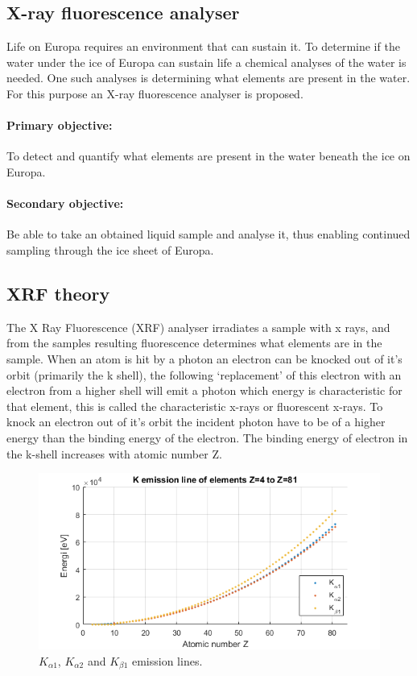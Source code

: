 \subsection{X-ray fluorescence analyser}
Life on Europa requires an environment that can sustain it. To determine if the water under the ice of Europa can sustain life a chemical analyses of the water is needed. One such analyses is determining what elements are present in the water. For this purpose an X-ray fluorescence analyser is proposed.

\paragraph{Primary objective:}
To detect and quantify what elements are present in the water beneath the ice on Europa.

\paragraph{Secondary objective:}
Be able to take an obtained liquid sample and analyse it, thus enabling continued sampling through the ice sheet of Europa.


\subsection{XRF theory}

The X Ray Fluorescence (XRF) analyser irradiates a sample with x rays, and from the samples resulting fluorescence determines what elements are in the sample. 
When an atom is hit by a photon an electron can be knocked out of it’s orbit (primarily  the k shell), the following ‘replacement’ of this electron with an electron from a higher shell  will emit a photon which energy is characteristic for that element, this is called the characteristic x-rays or fluorescent x-rays. To knock an electron out of it’s orbit the incident photon have to be of a higher energy than the binding energy of the electron. The binding energy of electron in the k-shell increases with atomic number Z. 

\begin{figure}[h]
	\centering
	\includegraphics[width=\textwidth]{figures/XRF/Kalpha12Lines.png}
	\caption{$K_{\alpha 1}$, $K_{\alpha 2}$ and $K_{\beta 1}$ emission lines.}
	\label{fig:KalphaEmiLines}
\end{figure}

